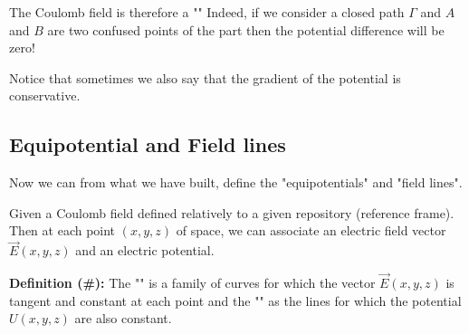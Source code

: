 	The Coulomb field is therefore a "" Indeed, if we consider a closed path $\Gamma$ and $A$ and $B$ are two confused points of the part then the potential difference will be zero!
	
	Notice that sometimes we also say that the gradient of the potential is conservative.

	\pagebreak
	\subsection{Equipotential and Field lines}
	Now we can from what we have built, define the "equipotentials" and "field lines".
	
	Given a Coulomb field defined relatively to a given repository (reference frame). Then at each point $(x, y, z)$ of space, we can associate an electric field vector $\vec{E}(x,y,z)$ and an electric potential.
	
	\textbf{Definition (\#\mydef):} The "" is a family of curves for which the vector $\vec{E}(x,y,z)$ is tangent and constant at each point and the "\label{equipotentials}" as the lines for which the potential $U (x, y, z)$ are also constant.
	
